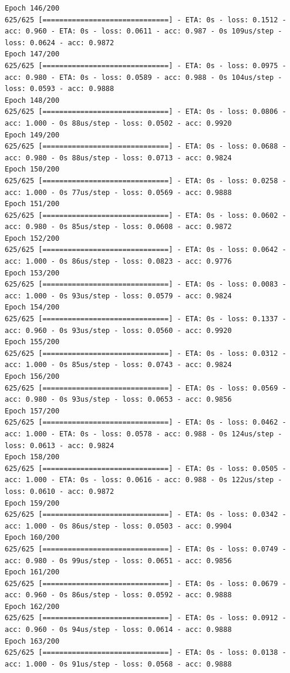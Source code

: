 \documentclass[11pt]{article}
\begin{document}
\begin{Verbatim}[commandchars=\\\{\}]
Epoch 146/200
625/625 [==============================] - ETA: 0s - loss: 0.1512 - acc: 0.960 - ETA: 0s - loss: 0.0611 - acc: 0.987 - 0s 109us/step - loss: 0.0624 - acc: 0.9872
Epoch 147/200
625/625 [==============================] - ETA: 0s - loss: 0.0975 - acc: 0.980 - ETA: 0s - loss: 0.0589 - acc: 0.988 - 0s 104us/step - loss: 0.0593 - acc: 0.9888
Epoch 148/200
625/625 [==============================] - ETA: 0s - loss: 0.0806 - acc: 1.000 - 0s 88us/step - loss: 0.0502 - acc: 0.9920
Epoch 149/200
625/625 [==============================] - ETA: 0s - loss: 0.0688 - acc: 0.980 - 0s 88us/step - loss: 0.0713 - acc: 0.9824
Epoch 150/200
625/625 [==============================] - ETA: 0s - loss: 0.0258 - acc: 1.000 - 0s 77us/step - loss: 0.0569 - acc: 0.9888
Epoch 151/200
625/625 [==============================] - ETA: 0s - loss: 0.0602 - acc: 0.980 - 0s 85us/step - loss: 0.0608 - acc: 0.9872
Epoch 152/200
625/625 [==============================] - ETA: 0s - loss: 0.0642 - acc: 1.000 - 0s 86us/step - loss: 0.0823 - acc: 0.9776
Epoch 153/200
625/625 [==============================] - ETA: 0s - loss: 0.0083 - acc: 1.000 - 0s 93us/step - loss: 0.0579 - acc: 0.9824
Epoch 154/200
625/625 [==============================] - ETA: 0s - loss: 0.1337 - acc: 0.960 - 0s 93us/step - loss: 0.0560 - acc: 0.9920
Epoch 155/200
625/625 [==============================] - ETA: 0s - loss: 0.0312 - acc: 1.000 - 0s 85us/step - loss: 0.0743 - acc: 0.9824
Epoch 156/200
625/625 [==============================] - ETA: 0s - loss: 0.0569 - acc: 0.980 - 0s 93us/step - loss: 0.0653 - acc: 0.9856
Epoch 157/200
625/625 [==============================] - ETA: 0s - loss: 0.0462 - acc: 1.000 - ETA: 0s - loss: 0.0578 - acc: 0.988 - 0s 124us/step - loss: 0.0613 - acc: 0.9824
Epoch 158/200
625/625 [==============================] - ETA: 0s - loss: 0.0505 - acc: 1.000 - ETA: 0s - loss: 0.0616 - acc: 0.988 - 0s 122us/step - loss: 0.0610 - acc: 0.9872
Epoch 159/200
625/625 [==============================] - ETA: 0s - loss: 0.0342 - acc: 1.000 - 0s 86us/step - loss: 0.0503 - acc: 0.9904
Epoch 160/200
625/625 [==============================] - ETA: 0s - loss: 0.0749 - acc: 0.980 - 0s 99us/step - loss: 0.0651 - acc: 0.9856
Epoch 161/200
625/625 [==============================] - ETA: 0s - loss: 0.0679 - acc: 0.960 - 0s 86us/step - loss: 0.0592 - acc: 0.9888
Epoch 162/200
625/625 [==============================] - ETA: 0s - loss: 0.0912 - acc: 0.960 - 0s 94us/step - loss: 0.0614 - acc: 0.9888
Epoch 163/200
625/625 [==============================] - ETA: 0s - loss: 0.0138 - acc: 1.000 - 0s 91us/step - loss: 0.0568 - acc: 0.9888

\end{Verbatim}
\end{document}

